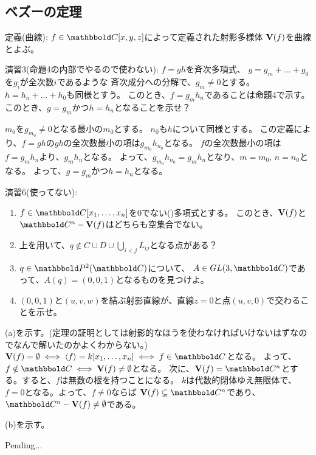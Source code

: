 \subsection{ベズーの定理}
\label{sub:ベズーの定理}

\begin{framed}
  定義(曲線):
  $f\in \C[x,y,z]$によって定義された射影多様体
  $\textbf V(f)$を曲線とよぶ。
\end{framed}

\begin{framed}
  演習3(命題4の内部でやるので使わない):
  $f=gh$を斉次多項式、
  $g=g_m + \dots +g_0$を$g_i$が全次数$i$であるような
  斉次成分への分解で、$g_m \neq 0$とする。
  $h = h_n + \dots + h_0$も同様とすう。
  このとき、$f=g_m h_n$であることは命題4で示す。
  このとき、$g=g_m$かつ$h=h_n$となることを示せ？
\end{framed}
\begin{myproof}
  $m_0$を$g_{m_0}\neq 0$となる最小の$m_0$とする。
  $n_0$も$h$について同様とする。
  この定義により、$f=gh$の$gh$の全次数最小の項は$g_{m_0}h_{n_0}$となる。
  $f$の全次数最小の項は$f=g_m h_n$より、$g_m h_n$となる。
  よって、$g_{m_0}h_{n_0} = g_m h_n$となり、$m=m_0,\,n=n_0$となる。
  よって、$g=g_m$かつ$h=h_n$となる。
\end{myproof}

\begin{framed}
  演習6(使ってない):
  \begin{enumerate}[label=(\alph*)]
    \item
    $f\in \C[x_1,\dots,x_n]$を0でない()多項式とする。
    このとき、$\textbf V(f)$と$\C^n-\var(f)$はどちらも空集合でない。
    \item
    上を用いて、$q\notin C \cup D \cup \bigcup_{i<j} L_{ij}$となる点がある？
    \item
    $q\in \P^2(\C)$について、
    $A\in GL(3,\C)$であって、$A(q) = (0,0,1)$となるものを見つけよ。
    \item
    $(0,0,1)$と$(u,v,w)$を結ぶ射影直線が、直線$z=0$と点$(u,v,0)$で交わることを示せ。
  \end{enumerate}
\end{framed}
\begin{myproof}
  (a)を示す。(定理の証明としては射影的なほうを使わなければいけないはずなのでなんで解いたのかよくわからない。)
  $\var(f)= \emptyset \iff \gen{f} = k[x_1,\dots,x_n] \iff f\in \C$となる。
  よって、$f\notin \C \iff \var(f) \neq \emptyset$となる。
  次に、$\var(f) = \C^n$とする。すると、$f$は無数の根を持つことになる。
  $k$は代数的閉体ゆえ無限体で、$f=0$となる。よって、$f\neq 0$ならば
  $\var(f) \subsetneq \C^n$であり、$\C^n-\var(f) \neq \emptyset$である。

  (b)を示す。

  Pending...
\end{myproof}

